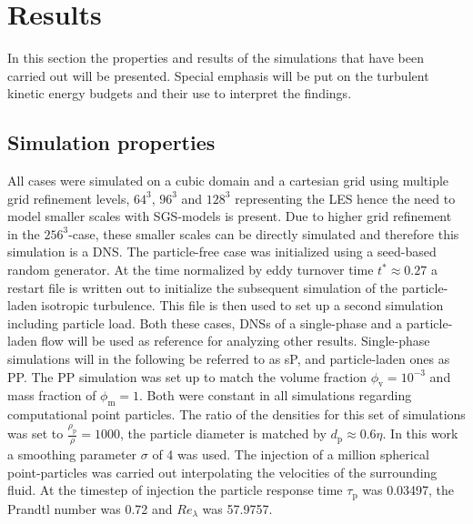 \documentclass[11pt,a4paper,openany,oneside,parskip=half*]{article}
\begin{document}
\section{Results}
In this section the properties and results of the simulations that have been carried out will be presented. Special emphasis will be put on the turbulent kinetic energy budgets and their use to interpret the findings.
\newline
\subsection{Simulation properties}
All cases were simulated on a cubic domain and a cartesian grid using multiple grid refinement levels, $64^3$, $96^3$ and $128^3$ representing the LES hence the need to model smaller scales with SGS-models is present. Due to higher grid refinement in the $256^3$-case, these smaller scales can be directly simulated and therefore this simulation is a DNS.
\newline
The particle-free case was initialized using a seed-based random generator. At the time normalized by eddy turnover time $t^* \approx 0.27$ a restart file is written out to initialize the subsequent simulation of the particle-laden isotropic turbulence. This file is then used to set up a second simulation including particle load. Both these cases, DNSs of a single-phase and a particle-laden flow will be used as reference for analyzing other results. Single-phase simulations will in the following be referred to as sP, and particle-laden ones as PP. The PP simulation was set up to match the volume fraction $\phi_\mathrm{v}= 10^{-3}$ and mass fraction of $\phi_\mathrm{m}=1$. Both were constant in all simulations regarding computational point particles. The ratio of the densities for this set of simulations was set to $\frac{\rho_\mathrm{p}}{\rho} = 1000$, the particle diameter is matched by $d_\mathrm{p} \approx 0.6 \eta$. In this work a smoothing parameter $\sigma$ of 4 was used. The injection of a million spherical point-particles was carried out interpolating the velocities of the surrounding fluid. At the timestep of injection the particle response time $\tau_\mathrm{p}$ was 0.03497, the Prandtl number was 0.72 and $Re_\lambda$ was 57.9757. 
\newline
\end{document}
